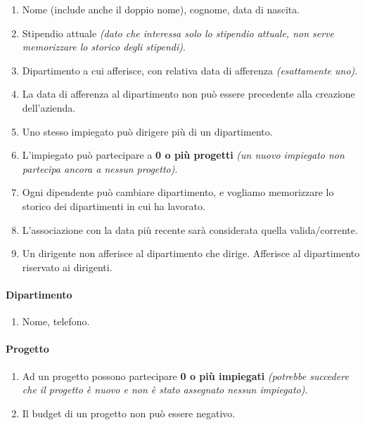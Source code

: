 \documentclass{article}
\begin{document}
\begin{enumerate}
    \item Nome (include anche il doppio nome), cognome, data di nascita. 
    \item Stipendio attuale \textit{(dato che interessa solo lo stipendio attuale, non serve memorizzare lo storico degli stipendi)}.
    \item Dipartimento a cui afferisce, con relativa data di afferenza \textit{(esattamente uno)}.
    \item La data di afferenza al dipartimento non può essere precedente alla creazione dell'azienda.
    \item Uno stesso impiegato può dirigere più di un dipartimento.
    \item L'impiegato può partecipare a \textbf{0 o più progetti} \textit{(un nuovo impiegato non partecipa ancora a nessun progetto)}.
    \item Ogni dipendente può cambiare dipartimento, e vogliamo memorizzare lo storico dei dipartimenti in cui ha lavorato.
    \item L'associazione con la data più recente sarà considerata 
    quella valida/corrente.
    \item Un dirigente non afferisce al dipartimento che dirige. Afferisce al dipartimento riservato ai dirigenti.
\end{enumerate}

\paragraph{Dipartimento}

\begin{enumerate}
    \item Nome, telefono.
\end{enumerate}

\paragraph{Progetto}

\begin{enumerate}
    \item Ad un progetto possono partecipare \textbf{0 o più impiegati} \textit{(potrebbe succedere che il progetto è nuovo e non è stato assegnato nessun impiegato)}.
    \item Il budget di un progetto non può essere negativo. 
\end{enumerate}
\end{document}
